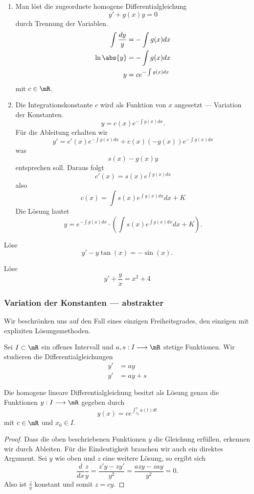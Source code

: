 \documentclass[%
draft,
11pt,%
twoside,%
titlepage,%
german,%
headsepline%
]{scrartcl}
\begin{document}
\begin{enumerate}
\item Man l\"ost die zugeordnete homogene Differentialgleichung
$$y'+g(x)y=0$$
durch Trennung der Variablen.
\begin{align*}
\int\frac{dy}{y} &= -\int g(x)dx\\
\ln\abs{y} &= -\int g(x)dx\\
y &= ce^{-\int g(x)dx}
\end{align*}
mit $c\in\mR$.
\item Die
Integrationskonstante $c$ wird als Funktion von $x$ angesetzt --- Variation der Konstanten.
$$y=c(x)e^{-\int g(x)dx}.$$
F\"ur die Ableitung erhalten wir
$$y' = c'(x)e^{-\int g(x)dx}+c(x)(-g(x))e^{-\int g(x)dx}$$
was
$$s(x)-g(x)y$$
entsprechen soll. Daraus folgt
$$c'(x)=s(x)e^{\int g(x)dx}$$
also
$$c(x)=\int s(x)e^{\int g(x)dx}dx+K$$
Die L\"osung lautet
$$y=e^{-\int g(x)dx}\cdot\left(\int s(x)e^{\int g(x)dx}dx+K\right).$$
\end{enumerate}

\begin{ueb}
L\"ose
$$y'-y\tan(x)=-\sin(x).$$
\end{ueb}

\begin{ueb}
L\"ose
$$y'+\frac{y}{x}=x^2+4$$
\end{ueb}

\subsubsection{Variation der Konstanten --- abstrakter}

Wir beschr\"onken uns auf den Fall eines einzigen Freiheitsgrades, den einzigen mit expliziten L\"osungsmethoden.

Sei $I\subset\mR$ ein offenes Intervall und $a,s:I\longrightarrow\mR$ stetige Funktionen. Wir studieren die Differentialgleichungen
\begin{align}
y' &= ay\\
y' &=ay+s
\end{align}

\begin{satz}
Die homogene lineare Differentialgleichung besitzt als L\"osung genau die Funktionen $y:I\longrightarrow\mR$ gegeben durch
$$y(x)=ce^{\int_{x_0}^xa(t)dt}$$
mit $c\in\mR$ und $x_0\in I$.
\end{satz}

\begin{proof}
Dass die oben beschriebenen Funktionen $y$ die Gleichung erf\"ullen, erkennen wir durch Ableiten. F\"ur die Eindeutigkeit brauchen wir auch ein direktes Argument. Sei $y$ wie oben und $z$ eine weitere L\"osung, so ergibt sich
$$\frac{d}{dx}\frac{z}{y}=\frac{z'y-zy'}{y^2}=\frac{azy-zay}{y^2}=0.$$
Also ist $\frac{z}{y}$ konstant und somit $z=cy$.
\end{proof}
\end{document}

